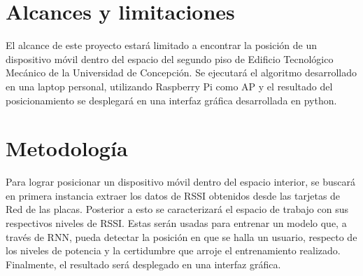 
\section{Alcances y limitaciones}
El alcance de este proyecto estará limitado a encontrar la posición de un dispositivo móvil dentro del espacio del segundo piso de Edificio Tecnológico Mecánico de la Universidad de Concepción. Se ejecutará el algoritmo desarrollado en una laptop personal, utilizando Raspberry Pi como \ac{AP} y el resultado del posicionamiento se desplegará en una interfaz gráfica desarrollada en python.

\section{Metodología}

Para lograr posicionar un dispositivo móvil dentro del espacio interior, se buscará en primera instancia extraer los datos de RSSI obtenidos desde las tarjetas de Red de las placas. Posterior a esto se caracterizará el espacio de trabajo con sus respectivos niveles de RSSI. Estas serán usadas para entrenar un modelo que, a través de RNN, pueda detectar la posición en que se halla un usuario, respecto de los niveles de potencia y la certidumbre que arroje el entrenamiento realizado. Finalmente, el resultado será desplegado en una interfaz gráfica.